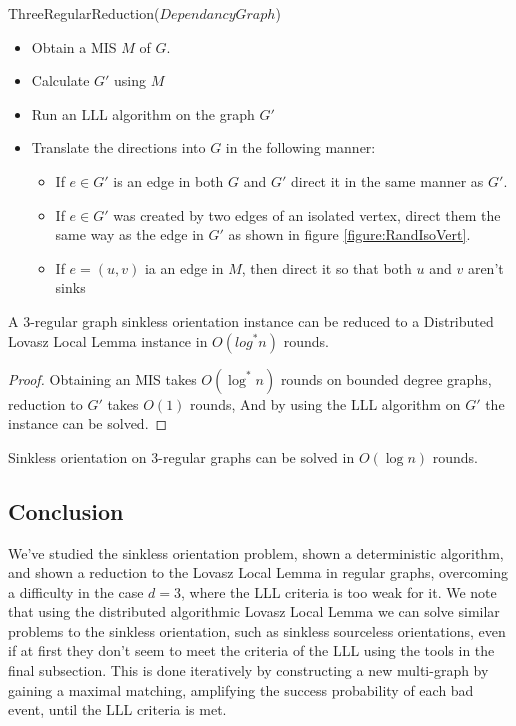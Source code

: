 \begin{algorithm}\label{ThreeRegularReduction}\small
\caption{\small ThreeRegularReduction($DependancyGraph$)}
\begin{itemize}
\item Obtain a MIS $M$ of $G$.
\item Calculate $G'$ using $M$
\item Run an LLL algorithm on the graph $G'$
\item Translate the directions into $G$ in the following manner:
\begin{itemize}
\item If $e \in G'$ is an edge in both $G$ and $G'$ direct it in the same manner as $G'$.
\item If $e \in G'$ was created by two edges of an isolated vertex, direct them the same way as the edge in $G'$ as shown in figure \ref{figure:RandIsoVert}.
\item If $e=(u,v)$ ia an edge in $M$, then direct it so that both $u$ and $v$ aren't sinks
\end{itemize}
\end{itemize}
\end{algorithm}

\begin{theorem}
 A 3-regular graph sinkless orientation instance can be reduced to a Distributed Lovasz Local Lemma instance in $O(log^*n)$ rounds.
\end{theorem}
\begin{proof}
Obtaining an MIS takes $O(\log^* n)$ rounds on bounded degree graphs, reduction to $G'$ takes $O(1)$ rounds, And by using the LLL algorithm on $G'$ the instance can be solved.
\end{proof}
\begin{corollary}
Sinkless orientation on 3-regular graphs can be solved in $O(\log n)$ rounds.
\end{corollary}

\subsection{Conclusion}
We've studied the sinkless orientation problem, shown a deterministic algorithm, and shown a reduction to the Lovasz Local Lemma in regular graphs, overcoming a difficulty in the case $d=3$, where the LLL criteria is too weak for it. We note that using the distributed algorithmic Lovasz Local Lemma we can solve similar problems to the sinkless orientation, such as sinkless sourceless orientations, even if at first they don't seem to meet the criteria of the LLL using the tools in the final subsection. This is done iteratively by constructing a new multi-graph by gaining a maximal matching, amplifying the success probability of each bad event, until the LLL criteria is met.

